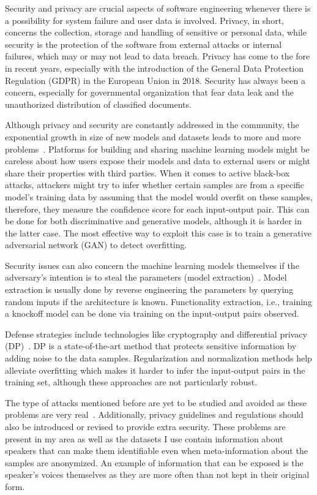 \documentclass[11pt]{article}
\begin{document}
Security and privacy are crucial aspects of software engineering whenever there is a possibility for system failure and user data is involved. Privacy, in short, concerns the collection, storage and handling of sensitive or personal data, while security is the protection of the software from external attacks or internal failures, which may or may not lead to data breach. Privacy has come to the fore in recent years, especially with the introduction of the General Data Protection Regulation (GDPR) in the European Union in 2018. Security has always been a concern, especially for governmental organization that fear data leak and the unauthorized distribution of classified documents.

Although privacy and security are constantly addressed in the community, the exponential growth in size of new models and datasets leads to more and more problems~\cite{9433648}. Platforms for building and sharing machine learning models might be careless about how users expose their models and data to external users or might share their properties with third parties. When it comes to active black-box attacks, attackers might try to infer whether certain samples are from a specific model's training data by assuming that the model would overfit on these samples, therefore, they measure the confidence score for each input-output pair. This can be done for both discriminative and generative models, although it is harder in the latter case. The most effective way to exploit this case is to train a generative adversarial network (GAN) to detect overfitting.

Security issues can also concern the machine learning models themselves if the adversary's intention is to steal the parameters (model extraction)~\cite{9433648}. Model extraction is usually done by reverse engineering the parameters by querying random inputs if the architecture is known. Functionality extraction, i.e., training a knockoff model can be done via training on the input-output pairs observed.

Defense strategies include technologies like cryptography and differential privacy (DP)~\cite{9433648}. DP is a state-of-the-art method that protects sensitive information by adding noise to the data samples. Regularization and normalization methods help alleviate overfitting which makes it harder to infer the input-output pairs in the training set, although these approaches are not particularly robust.

The type of attacks mentioned before are yet to be studied and avoided as these problems are very real~\cite{9433648}. Additionally, privacy guidelines and regulations should also be introduced or revised to provide extra security. These problems are present in my area as well as the datasets I use contain information about speakers that can make them identifiable even when meta-information about the samples are anonymized. An example of information that can be exposed is the speaker's voices themselves as they are more often than not kept in their original form.
\end{document}
